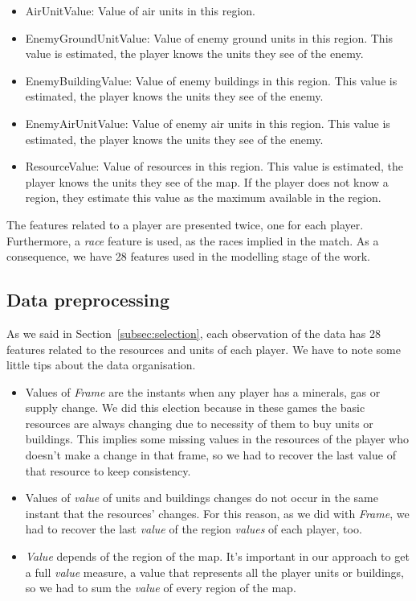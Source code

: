 \documentclass[a4paper,twoside]{article}\usepackage[]{graphicx}\usepackage[]{color}
\begin{document}
\begin{itemize}
\begin{itemize}
    \item AirUnitValue: Value of air units in this region.
    \item EnemyGroundUnitValue: Value of enemy ground units in this region.
    This value is estimated, the player knows the units they see of the enemy.
    \item EnemyBuildingValue: Value of enemy buildings in this region.
    This value is estimated, the player knows the units they see of the enemy.
    \item EnemyAirUnitValue: Value of enemy air units in this region.
    This value is estimated, the player knows the units they see of the enemy.
    \item ResourceValue: Value of resources in this region. This value is
    estimated, the player knows the units they see of the map.
    If the player does not know a region, they estimate this value as the maximum
    available in the region.
  \end{itemize}
\end{itemize}

The features related to a player are presented twice, one for each player.
Furthermore, a \emph{race} feature is used, as the races implied in the match.
As a consequence, we have 28 features used in the modelling stage of the work.

\subsection{Data preprocessing}
\label{subsec:preprocess}

As we said in Section~\ref{subsec:selection}, each observation of the data has 28
features related to the resources and units of each player. We have to note
some little tips about the data organisation.

\begin{itemize}
  \item Values of \emph{Frame} are the instants when any player has
  a minerals, gas or supply change. We did this election because in these games
  the basic resources are always changing due to necessity of them to buy
  units or buildings. This implies some missing values in the resources of
  the player who doesn't make a change in that frame, so we had to recover the
  last value of that resource to keep consistency.
  \item Values of \emph{value} of units and buildings changes do not occur in the
  same instant that the resources' changes. For this reason, as we did with
  \emph{Frame}, we had to recover the last \emph{value} of the region
  \emph{values} of each player, too.
  \item \emph{Value} depends of the region of the map. It's important in our
  approach to get a full \emph{value} measure, a value that represents all
  the player units or buildings, so we had to sum the \emph{value} of every
  region of the map.
\end{itemize}
\end{document}
